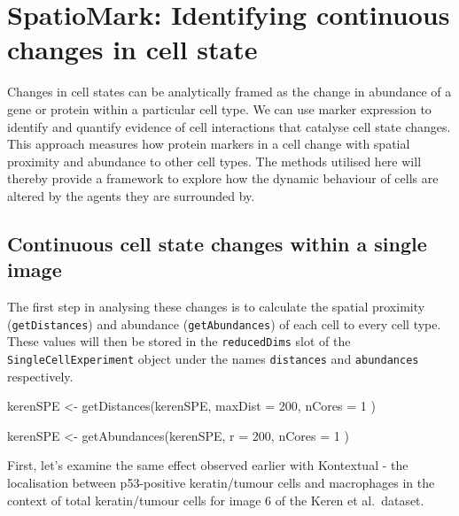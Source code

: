 \documentclass[
  letterpaper,
  DIV=11,
  numbers=noendperiod]{scrreprt}
\newenvironment{Shaded}{\begin{snugshade}}{\end{snugshade}}
\newcommand{\AttributeTok}[1]{\textcolor[rgb]{0.40,0.45,0.13}{#1}}
\newcommand{\DecValTok}[1]{\textcolor[rgb]{0.68,0.00,0.00}{#1}}
\newcommand{\FunctionTok}[1]{\textcolor[rgb]{0.28,0.35,0.67}{#1}}
\newcommand{\NormalTok}[1]{\textcolor[rgb]{0.00,0.23,0.31}{#1}}
\newcommand{\OtherTok}[1]{\textcolor[rgb]{0.00,0.23,0.31}{#1}}
\begin{document}
\section{SpatioMark: Identifying continuous changes in cell
state}\label{spatiomark-identifying-continuous-changes-in-cell-state}

Changes in cell states can be analytically framed as the change in
abundance of a gene or protein within a particular cell type. We can use
marker expression to identify and quantify evidence of cell interactions
that catalyse cell state changes. This approach measures how protein
markers in a cell change with spatial proximity and abundance to other
cell types. The methods utilised here will thereby provide a framework
to explore how the dynamic behaviour of cells are altered by the agents
they are surrounded by.

\subsection{Continuous cell state changes within a single
image}\label{continuous-cell-state-changes-within-a-single-image}

The first step in analysing these changes is to calculate the spatial
proximity (\texttt{getDistances}) and abundance (\texttt{getAbundances})
of each cell to every cell type. These values will then be stored in the
\texttt{reducedDims} slot of the \texttt{SingleCellExperiment} object
under the names \texttt{distances} and \texttt{abundances} respectively.

\begin{Shaded}
\begin{Highlighting}[]
\NormalTok{kerenSPE }\OtherTok{\textless{}{-}} \FunctionTok{getDistances}\NormalTok{(kerenSPE,}
  \AttributeTok{maxDist =} \DecValTok{200}\NormalTok{,}
  \AttributeTok{nCores =} \DecValTok{1}
\NormalTok{)}

\NormalTok{kerenSPE }\OtherTok{\textless{}{-}} \FunctionTok{getAbundances}\NormalTok{(kerenSPE,}
  \AttributeTok{r =} \DecValTok{200}\NormalTok{,}
  \AttributeTok{nCores =} \DecValTok{1}
\NormalTok{)}
\end{Highlighting}
\end{Shaded}

First, let's examine the same effect observed earlier with Kontextual -
the localisation between p53-positive keratin/tumour cells and
macrophages in the context of total keratin/tumour cells for image 6 of
the Keren et al.~dataset.
\end{document}
